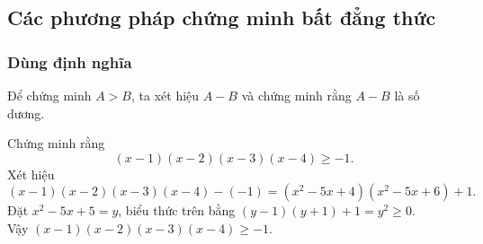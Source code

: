 \subsection{Các phương pháp chứng minh bất đẳng thức}
\subsubsection{Dùng định nghĩa}
Để chứng minh $A>B$, ta xét hiệu $A-B$ và chứng minh rằng $A-B$ là số dương.
\setcounter{vd}{87}%
\begin{vd}%
	Chứng minh rằng $$\left(x-1\right)\left(x-2\right)\left(x-3\right)\left(x-4\right)\geq -1.$$
	\loigiai
	{
	Xét hiệu $\left(x-1\right)\left(x-2\right)\left(x-3\right)\left(x-4\right)-(-1)=(x^2-5x+4)(x^2-5x+6)+1.$\\
	Đặt $x^2-5x+5=y$, biểu thức trên bằng $(y-1)(y+1)+1=y^2\geq 0$.\\
	Vậy $\left(x-1\right)\left(x-2\right)\left(x-3\right)\left(x-4\right)\geq -1.$
	}
\end{vd}
